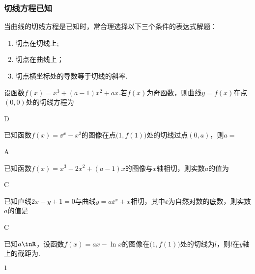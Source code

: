     \subsubsection{切线方程已知}
      当曲线的切线方程是已知时，常合理选择以下三个条件的表达式解题：
      {\kaishu \begin{enumerate}[1)]
      	\item 切点在切线上;
      	\item 切点在曲线上；
      	\item 切点横坐标处的导数等于切线的斜率.
      \end{enumerate}


    }
\begin{exercise}
  \item %
    设函数$f(x)=x^3+(a-1)x^2+ax$.若$f(x)$为奇函数，则曲线$y=f(x)$在点$(0,0)$处的切线方程为\xz
    \begin{answer}
      D
    \end{answer}
  \item %
    已知函数$f(x)=\ee^x-x^2$的图像在点$\bigl(1,f(1)\bigr)$处的切线过点$(0,a)$，则$a=$\xz
    \begin{answer}
      A
    \end{answer}
  \item %
    已知函数$f(x)=x^3-2x^2+(a-1)x$的图像与$x$轴相切，则实数$a$的值为\xz
    \begin{answer}
      C
    \end{answer}
  \item %
    已知直线$2x-y+1=0$与曲线$y=a\ee^x+x$相切，其中$\ee$为自然对数的底数，则实数$a$的值是\xz
    \begin{answer}
      C
    \end{answer}
  \item %
    已知$a\inR$，设函数$f(x)=ax-\ln x$的图像在$\bigl(1,f(1)\bigr)$处的切线为$l$，则$l$在$y$轴上的截距为\tk.
    \begin{answer}
      $1$
    \end{answer}
\end{exercise}


